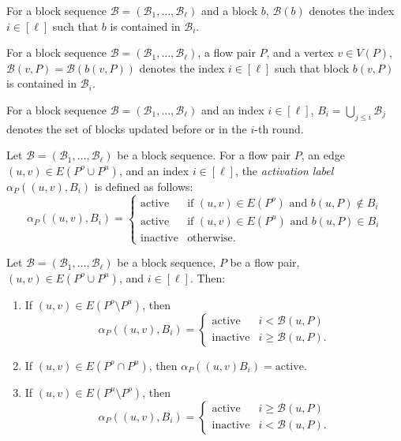 \documentclass[fontsize=11pt,paper=a4]{book}
\begin{document}
\begin{notation}
For a block sequence \(\mathcal{B}=(\mathscr{B}_1,\dots,\mathscr{B}_{\ell})\) and a block \(b\), \(\mathcal{B}(b)\) denotes the index \(i\in[\ell]\) such that \(b\) is contained in \(\mathscr{B}_i\).
\label{orge8cadd8}
\end{notation}

\begin{notation}
For a block sequence \(\mathcal{B}=(\mathscr{B}_1,\dots,\mathscr{B}_{\ell})\), a flow pair \(P\), and a vertex \(v\in V(P)\), \(\mathcal{B}(v,P)=\mathcal{B}(b(v,P))\) denotes the index \(i\in[\ell]\) such that block \(b(v,P)\) is contained in \(\mathscr{B}_i\).
\label{org99dba3a}
\end{notation}

\begin{notation}
For a block sequence \(\mathcal{B}=(\mathscr{B}_1,\dots,\mathscr{B}_{\ell})\) and an index \(i\in[\ell]\), \(B_i=\bigcup_{j\leq i}\mathscr{B}_j\) denotes the set of blocks updated before or in the \(i\)-th round.
\label{org56dcc69}
\end{notation}

\begin{defn}
Let \(\mathcal{B}=(\mathscr{B}_1,\dots,\mathscr{B}_{\ell})\) be a block sequence.
For a flow pair \(P\), an edge \((u,v)\in E(P^o\cup P^u)\), and an index \(i\in[\ell]\), the \emph{activation label} \(\alpha_P((u,v),B_i)\) is defined as follows:
\[\alpha_P((u,v),B_i)=
\begin{cases}
\mathrm{active} & \text{if }(u,v)\in E(P^o)\text{ and }b(u,P)\notin B_i\\
\mathrm{active} & \text{if }(u,v)\in E(P^u)\text{ and }b(u,P)\in B_i\\
\mathrm{inactive} & \text{otherwise}.
\end{cases}\]
\label{org5295a66}
\end{defn}

\begin{lem}
Let \(\mathcal{B}=(\mathscr{B}_1,\dots,\mathscr{B}_{\ell})\) be a block sequence, \(P\) be a flow pair, \((u,v)\in E(P^o\cup P^u)\), and \(i\in[\ell]\).
Then:

\begin{enumerate}
\item If \((u,v)\in E(P^o\setminus P^u)\), then
\[\alpha_P((u,v),B_i)=
   \begin{cases}
   \mathrm{active} & i<\mathcal{B}(u,P)\\
   \mathrm{inactive} & i\geq\mathcal{B}(u,P).
   \end{cases}\]

\item If \((u,v)\in E(P^o\cap P^u)\), then \(\alpha_P((u,v)B_i)=\mathrm{active}\).

\item If \((u,v)\in E(P^u\setminus P^o)\), then
\[\alpha_P((u,v),B_i)=
   \begin{cases}
   \mathrm{active} & i\geq\mathcal{B}(u,P)\\
   \mathrm{inactive} & i<\mathcal{B}(u,P).
   \end{cases}\]
\end{enumerate}
\label{org6b790d7}
\end{lem}
\end{document}
